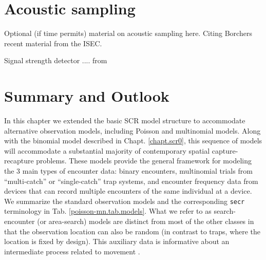 

\section{Acoustic sampling}


Optional (if time permits) material on acoustic sampling here. Citing Borchers
recent material from the ISEC. 

Signal strength detector .... from \citep{efford_etal:2009ecol}

\section{Summary and Outlook}

In this chapter we extended the basic SCR model structure to
accommodate alternative observation models, including Poisson and
multinomial models.  Along with the binomial model described in
Chapt. \ref{chapt.scr0}, this sequence of models will accommodate a substantial
 majority of contemporary spatial capture-recapture
problems. These models provide the general framework for modeling the
3 main types of encounter data: binary encounters, multinomial trials
from ``multi-catch'' or ``single-catch'' \citep{efford:2004,
  efford:2011, royle_gardner:2011} trap systems, and encounter frequency data from devices
that can record multiple encounters of the same individual at a
device.  We summarize the standard observation models and the
corresponding \mbox{\tt secr} terminology in
Tab. \ref{poisson-mn.tab.models}.
What we refer to as search-encounter (or area-search) models 
 are distinct from most of the other
classes in that the observation location can also be random (in
contrast to traps, where the location is fixed by design). This
auxiliary data is informative about an intermediate process related to
movement \citep{royle_young:2008}.

